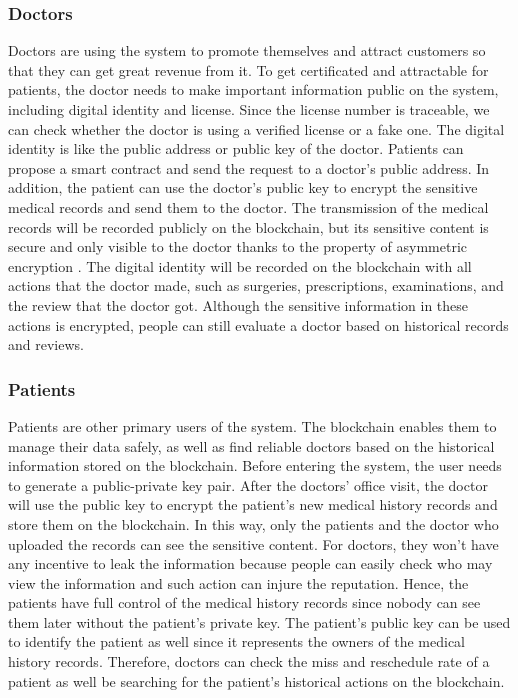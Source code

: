 \documentclass{article}
\begin{document}
\subsubsection{Doctors}
Doctors are using the system to promote themselves and attract customers so that they can get great revenue from it. To get certificated and attractable for patients, the doctor needs to make important information public on the system, including digital identity and license. Since the license number is traceable, we can check whether the doctor is using a verified license or a fake one. The digital identity is like the public address or public key of the doctor. Patients can propose a smart contract and send the request to a doctor's public address. In addition, the patient can use the doctor's public key to encrypt the sensitive medical records and send them to the doctor. The transmission of the medical records will be recorded publicly on the blockchain, but its sensitive content is secure and only visible to the doctor thanks to the property of asymmetric encryption \cite{encryption}. The digital identity will be recorded on the blockchain with all actions that the doctor made, such as surgeries, prescriptions, examinations, and the review that the doctor got. Although the sensitive information in these actions is encrypted, people can still evaluate a doctor based on historical records and reviews.
\subsubsection{Patients}
Patients are other primary users of the system. The blockchain enables them to manage their data safely, as well as find reliable doctors based on the historical information stored on the blockchain. Before entering the system, the user needs to generate a public-private key pair. After the doctors' office visit, the doctor will use the public key to encrypt the patient's new medical history records and store them on the blockchain. In this way, only the patients and the doctor who uploaded the records can see the sensitive content. For doctors, they won't have any incentive to leak the information because people can easily check who may view the information and such action can injure the reputation. Hence, the patients have full control of the medical history records since nobody can see them later without the patient's private key. The patient's public key can be used to identify the patient as well since it represents the owners of the medical history records. Therefore, doctors can check the miss and reschedule rate of a patient as well be searching for the patient's historical actions on the blockchain.
\end{document}

